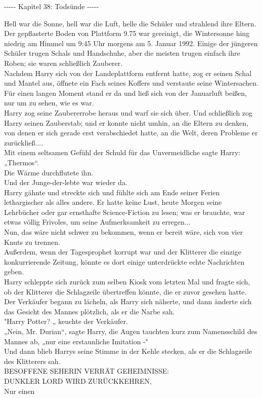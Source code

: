 

\hypertarget{todsuxfcnde}{%

-\/-\/-\/-\/- Kapitel 38: Todsünde -\/-\/-\/-\/-

Hell war die Sonne, hell war die Luft, helle die Schüler und strahlend ihre Eltern. Der gepflasterte Boden von Plattform 9.75 war gereinigt, die Wintersonne hing niedrig am Himmel um 9:45 Uhr morgens am 5. Januar 1992. Einige der jüngeren Schüler trugen Schals und Handschuhe, aber die meisten trugen einfach ihre Roben; sie waren schließlich Zauberer.\\ Nachdem Harry sich von der Landeplattform entfernt hatte, zog er seinen Schal und Mantel aus, öffnete ein Fach seines Koffers und verstaute seine Wintersachen.\\ Für einen langen Moment stand er da und ließ sich von der Januarluft beißen, nur um zu sehen, wie es war.\\ Harry zog seine Zaubererrobe heraus und warf sie sich über. Und schließlich zog Harry seinen Zauberstab; und er konnte nicht umhin, an die Eltern zu denken, von denen er sich gerade erst verabschiedet hatte, an die Welt, deren Probleme er zurückließ....\\ Mit einem seltsamen Gefühl der Schuld für das Unvermeidliche sagte Harry: „Thermos“.\\ Die Wärme durchflutete ihn.\\ Und der Junge-der-lebte war wieder da.\\ Harry gähnte und streckte sich und fühlte sich am Ende seiner Ferien lethargischer als alles andere. Er hatte keine Lust, heute Morgen seine Lehrbücher oder gar ernsthafte Science-Fiction zu lesen; was er brauchte, war etwas völlig Frivoles, um seine Aufmerksamkeit zu erregen...\\ Nun, das wäre nicht schwer zu bekommen, wenn er bereit wäre, sich von vier Knuts zu trennen.\\ Außerdem, wenn der Tagesprophet korrupt war und der Klitterer die einzige konkurrierende Zeitung, könnte es dort einige unterdrückte echte Nachrichten geben.\\ Harry schleppte sich zurück zum selben Kiosk vom letzten Mal und fragte sich, ob der Klitterer die Schlagzeile übertreffen könnte, die er zuvor gesehen hatte.\\ Der Verkäufer begann zu lächeln, als Harry sich näherte, und dann änderte sich das Gesicht des Mannes plötzlich, als er die Narbe sah.\\ "Harry Potter? „ keuchte der Verkäufer.\\ „Nein, Mr. Durian“, sagte Harry, die Augen tauchten kurz zum Namensschild des Mannes ab, „nur eine erstaunliche Imitation -"\\ Und dann blieb Harrys seine Stimme in der Kehle stecken, als er die Schlagzeile des Klitterers sah.\\ BESOFFENE SEHERIN VERRÄT GEHEIMNISSE:\\ DUNKLER LORD WIRD ZURÜCKKEHREN,\\ Nur einen }
